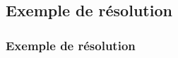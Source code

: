 \documentclass{beamer}
\begin{document}
\subsection{Exemple de résolution}
\begin{frame}
  \frametitle{Exemple de résolution}
  \begin{minipage}{.4\textwidth}    

\end{minipage}
\end{frame}
\end{document}

